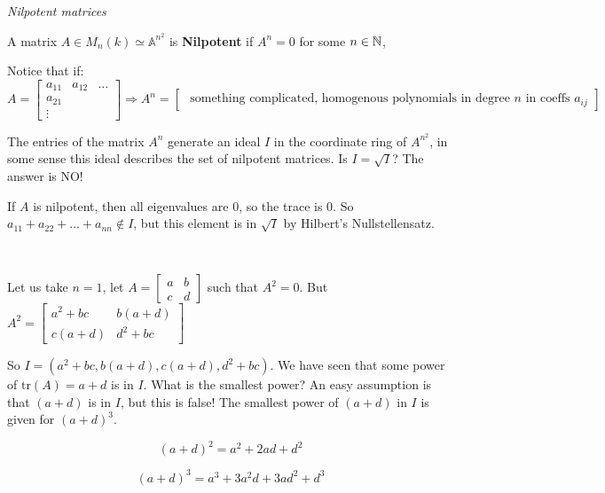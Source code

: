 \begin{example}\textit{Nilpotent matrices}

    \begin{definition}
        A matrix $A\in M_n(k)\simeq\mathbb{A}^{n^2}$ is \textbf{Nilpotent} if $A^n = 0$ for some $n\in \mathbb{N}$,
    \end{definition}
 
Notice that if:\begin{equation*}
    A = \begin{bmatrix}
        a_{11} & a_{12} & \dots\\
        a_{21}\\
        \vdots
    \end{bmatrix} \Rightarrow A^n = \begin{bmatrix}
        \text{ something complicated, homogenous polynomials in degree }n\text{ in coeffs }a_{ij}
    \end{bmatrix}
\end{equation*}

The entries of the matrix $A^n$ generate an ideal $I$ in the coordinate ring of $A^{n^2}$, in some sense this ideal describes the set of nilpotent matrices. Is $I = \sqrt{I}$? The answer is NO!

If $A$ is nilpotent, then all eigenvalues are $0$, so the trace is $0$. So $a_{11}+a_{22}+\dots+a_{nn}\not\in I$, but this element is in $\sqrt{I}$ by Hilbert's Nullstellensatz.

\

Let us take $n=1$, let $A = \begin{bmatrix}
    a & b\\
    c & d
\end{bmatrix}$ such that $A^2 = 0$. But $A^2 = \begin{bmatrix}
    a^2+bc & b(a+d)\\
    c(a+d) & d^2+bc
\end{bmatrix}$

So $I = (a^2+bc, b(a+d), c(a+d), d^2+bc)$. We have seen that some power of $\text{tr}(A) = a+d$ is in $I$. What is the smallest power?
An easy assumption is that $(a+d)$ is in $I$, but this is false! The smallest power of $(a+d)$ in $I$ is given for $(a+d)^3$.

\begin{equation*}
    (a+d)^2 = a^2 + 2ad + d^2
\end{equation*}

\begin{equation}
    (a+d)^3 = a^3+3a^2d+3ad^2+d^3
\end{equation}

\end{example}

